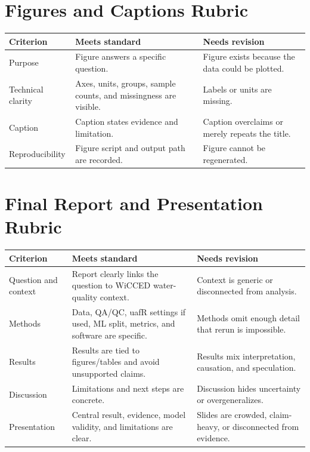 \section{Figures and Captions Rubric}
\begin{longtable}{p{}p{}p{}}
\toprule
\textbf{Criterion} & \textbf{Meets standard} & \textbf{Needs revision} \\
\midrule
Purpose & Figure answers a specific question. & Figure exists because the data could be plotted. \\
Technical clarity & Axes, units, groups, sample counts, and missingness are visible. & Labels or units are missing. \\
Caption & Caption states evidence and limitation. & Caption overclaims or merely repeats the title. \\
Reproducibility & Figure script and output path are recorded. & Figure cannot be regenerated. \\
\bottomrule
\end{longtable}

\section{Final Report and Presentation Rubric}
\begin{longtable}{p{}p{}p{}}
\toprule
\textbf{Criterion} & \textbf{Meets standard} & \textbf{Needs revision} \\
\midrule
Question and context & Report clearly links the question to WiCCED water-quality context. & Context is generic or disconnected from analysis. \\
Methods & Data, QA/QC, uafR settings if used, ML split, metrics, and software are specific. & Methods omit enough detail that rerun is impossible. \\
Results & Results are tied to figures/tables and avoid unsupported claims. & Results mix interpretation, causation, and speculation. \\
Discussion & Limitations and next steps are concrete. & Discussion hides uncertainty or overgeneralizes. \\
Presentation & Central result, evidence, model validity, and limitations are clear. & Slides are crowded, claim-heavy, or disconnected from evidence. \\
\bottomrule
\end{longtable}
